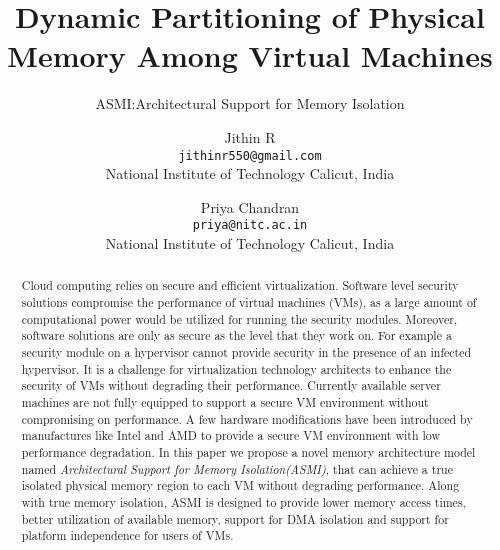 \documentclass[a4paper,10pt,twocolumn]{article}
\title{Dynamic Partitioning of Physical Memory Among Virtual Machines}
\subtitle{ASMI:Architectural Support for Memory Isolation}
\author{
  Jithin R\\
  \texttt{jithinr550@gmail.com}\\
  National Institute of Technology Calicut, India
  \and
  Priya Chandran\\
  \texttt{priya@nitc.ac.in}\\
  National Institute of Technology Calicut, India
}
\date{}
\begin{document}
\maketitle

\begin{abstract}
Cloud computing relies on secure and efficient virtualization. Software level security solutions compromise the performance of virtual machines (VMs), as a large amount of computational power would be utilized for running the security modules. Moreover, software solutions are only as secure as the level that they work on. For example a security module on a hypervisor cannot provide security in the presence of an infected hypervisor. It is a  challenge for  virtualization technology architects to enhance the security of VMs without degrading their performance. Currently available server machines are not fully equipped to support a secure VM environment without compromising on performance. A few hardware modifications have been introduced by manufactures like Intel and AMD to provide a secure VM environment with low performance degradation. In this paper we propose a novel memory architecture model named \textit{ Architectural Support for Memory Isolation(ASMI)}, that can achieve a true isolated physical 
memory region to each VM without degrading  performance. Along with true memory isolation, ASMI is designed to provide  lower memory access times, better utilization of available memory, support for DMA isolation and  support for platform independence for users of VMs.
\end{abstract}
\end{document}
